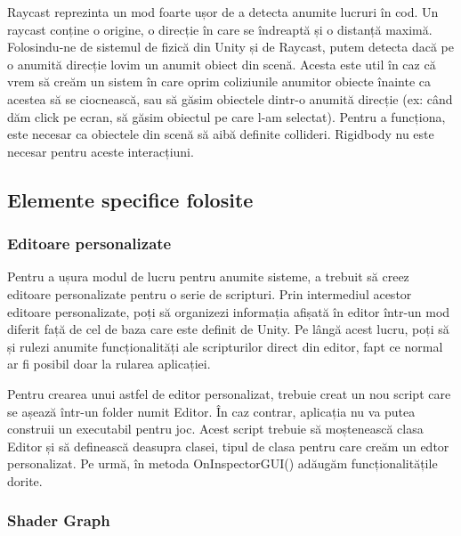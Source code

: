 \documentclass[12pt, a4paper]{article}
\begin{document}
	Raycast reprezinta un mod foarte ușor de a detecta anumite lucruri în cod. Un raycast conține o origine, o direcție în care se îndreaptă și o distanță maximă. Folosindu-ne de sistemul de fizică din Unity și de Raycast, putem detecta dacă pe o anumită direcție lovim un anumit obiect din scenă. Acesta este util în caz că vrem să creăm un sistem în care oprim coliziunile anumitor obiecte înainte ca acestea să se ciocnească, sau să găsim obiectele dintr-o anumită direcție (ex: când dăm click pe ecran, să găsim obiectul pe care l-am selectat). Pentru a funcționa, este necesar ca obiectele din scenă să aibă definite collideri. Rigidbody nu este necesar pentru aceste interacțiuni.
	
	
	
	
	\subsection{Elemente specifice folosite}
	\label{section: specificElements}	
	
	\subsubsection{Editoare personalizate}
	
	Pentru a ușura modul de lucru pentru anumite sisteme, a trebuit să creez editoare personalizate pentru o serie de scripturi. Prin intermediul acestor editoare personalizate, poți să organizezi informația afișată în editor într-un mod diferit față de cel de baza care este definit de Unity. Pe lângă acest lucru, poți să și rulezi anumite funcționalități ale scripturilor direct din editor, fapt ce normal ar fi posibil doar la rularea aplicației.
	\newline
	
	Pentru crearea unui astfel de editor personalizat, trebuie creat un nou script care se așează într-un folder numit Editor. În caz contrar, aplicația nu va putea construii un executabil pentru joc. Acest script trebuie să moștenească clasa Editor și să definească deasupra clasei, tipul de clasa pentru care creăm un edtor personalizat. Pe urmă, în metoda OnInspectorGUI() adăugăm funcționalitățile dorite.
	
	
	
	
	
	\subsubsection{Shader Graph}
	
\end{document}
